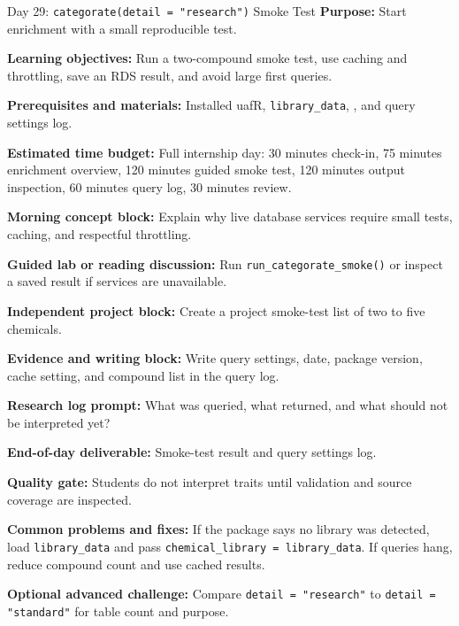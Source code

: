 \begin{dailybox}{Day 29: \texttt{categorate(detail = "research")} Smoke Test}
\textbf{Purpose:} Start enrichment with a small reproducible test.

\textbf{Learning objectives:} Run a two-compound smoke test, use caching and throttling, save an RDS result, and avoid large first queries.

\textbf{Prerequisites and materials:} Installed uafR, \texttt{library\_data}, , and query settings log.

\textbf{Estimated time budget:} Full internship day: 30 minutes check-in, 75 minutes enrichment overview, 120 minutes guided smoke test, 120 minutes output inspection, 60 minutes query log, 30 minutes review.

\textbf{Morning concept block:} Explain why live database services require small tests, caching, and respectful throttling.

\textbf{Guided lab or reading discussion:} Run \texttt{run\_categorate\_smoke()} or inspect a saved result if services are unavailable.

\textbf{Independent project block:} Create a project smoke-test list of two to five chemicals.

\textbf{Evidence and writing block:} Write query settings, date, package version, cache setting, and compound list in the query log.

\textbf{Research log prompt:} What was queried, what returned, and what should not be interpreted yet?

\textbf{End-of-day deliverable:} Smoke-test result and query settings log.

\textbf{Quality gate:} Students do not interpret traits until validation and source coverage are inspected.

\textbf{Common problems and fixes:} If the package says no library was detected, load \texttt{library\_data} and pass \texttt{chemical\_library = library\_data}. If queries hang, reduce compound count and use cached results.

\textbf{Optional advanced challenge:} Compare \texttt{detail = "research"} to \texttt{detail = "standard"} for table count and purpose.
\end{dailybox}

